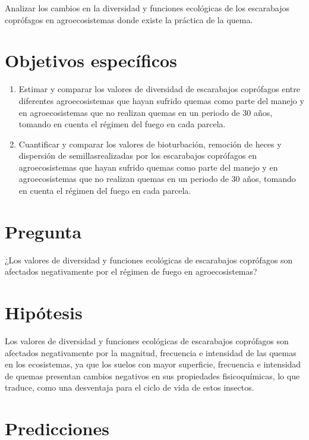 \documentclass[
  11pt,
  a4paper]{book}
\begin{document}
Analizar los cambios en la diversidad y funciones ecológicas de los escarabajos coprófagos en agroecosistemas donde existe la práctica de la quema.

\hypertarget{objetivos-especuxedficos}{%
\section{Objetivos específicos}\label{objetivos-especuxedficos}}

\begin{enumerate}
\def\labelenumi{\roman{enumi}.}
\item
  Estimar y comparar los valores de diversidad de escarabajos coprófagos entre diferentes agroecosistemas que hayan sufrido quemas como parte del manejo y en agroecosistemas que no realizan quemas en un periodo de 30 años, tomando en cuenta el régimen del fuego en cada parcela.
\item
  Cuantificar y comparar los valores de bioturbación, remoción de heces y dispersión de semillasrealizadas por los escarabajos coprófagos en agroecosistemas que hayan sufrido quemas como parte del manejo y en agroecosistemas que no realizan quemas en un periodo de 30 años, tomando en cuenta el régimen del fuego en cada parcela.
\end{enumerate}

\hypertarget{pregunta}{%
\section{Pregunta}\label{pregunta}}

¿Los valores de diversidad y funciones ecológicas de escarabajos coprófagos son afectados negativamente por el régimen de fuego en agroecosistemas?

\hypertarget{hipuxf3tesis}{%
\section{Hipótesis}\label{hipuxf3tesis}}

Los valores de diversidad y funciones ecológicas de escarabajos coprófagos son afectados negativamente por la magnitud, frecuencia e intensidad de las quemas en los ecosistemas, ya que los suelos con mayor superficie, frecuencia e intensidad de quemas presentan cambios negativos en sus propiedades fisicoquímicas, lo que traduce, como una desventaja para el ciclo de vida de estos insectos.

\hypertarget{predicciones}{%
\section{Predicciones}\label{predicciones}}
\end{document}
